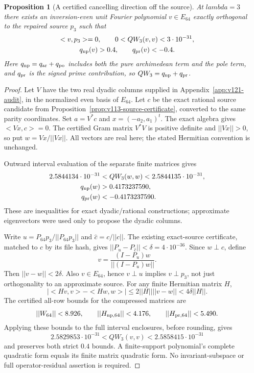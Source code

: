 \documentclass[11pt]{article}
\def\lambda{lambda}%
\def\norm#1{||#1||}%
\def\ip#1#2{<#1,#2>}%
\newtheorem{proposition}[theorem]{Proposition}
\theoremstyle{remark}
\newcommand{\norm}[1]{\left\lVert #1\right\rVert}
\newcommand{\ip}[2]{\left\langle #1,#2\right\rangle}
\begin{document}
\begin{proposition}[A certified cancelling direction off the source]
\label{prop:v121-complement-cancellation}
At $\lambda=3$ there exists an inversion-even unit Fourier polynomial
$v\in E_{64}$ exactly orthogonal to the repaired source $p_3$ such that
\begin{equation}\label{eq:v121-complement-cancellation}
 \begin{gathered}
 \ip{v}{p_3}=0,\qquad
 0<QW_3(v,v)<3\cdot10^{-31},\\
 q_{\rm np}(v)>0.4,\qquad q_{\rm pr}(v)<-0.4.
 \end{gathered}
\end{equation}
Here $q_{\rm np}=q_{\rm ar}+q_{\rm po}$ includes both the pure
archimedean term and the pole term, and $q_{\rm pr}$ is the signed
prime contribution, so $QW_3=q_{\rm np}+q_{\rm pr}$.
\end{proposition}
\begin{proof}
Let $V$ have the two real dyadic columns supplied in
Appendix~\ref{app:v121-audit}, in the normalized even basis of $E_{64}$.
Let $c$ be the exact rational source candidate from
Proposition~\ref{prop:v113-source-certificate}, converted to the same
parity coordinates. Set $a=V^*c$ and $x=(-a_2,a_1)^t$. The exact
algebra gives $\ip{Vx}{c}=0$. The certified Gram matrix $V^*V$ is
positive definite and $\norm{Vx}>0$, so put $w=Vx/\norm{Vx}$.
All vectors are real here; the stated Hermitian convention is unchanged.

Outward interval evaluation of the separate finite matrices gives
\[
 \begin{aligned}
 2.5844134\cdot10^{-31}&<QW_3(w,w)<2.5844135\cdot10^{-31},\\
 q_{\rm np}(w)&>0.4173237590,\\
 q_{\rm pr}(w)&<-0.4173237590.
 \end{aligned}
\]
These are inequalities for exact dyadic/rational constructions;
approximate eigenvectors were used only to propose the dyadic columns.

Write $u=P_{64}p_3/\norm{P_{64}p_3}$ and $\widehat c=c/\norm c$.
The existing exact-source certificate, matched to $c$ by its file hash,
gives $\norm{P_u-P_{\widehat c}}<\delta=4\cdot10^{-36}$.
Since $w\perp c$, define
\[
 v=\frac{(I-P_u)w}{\norm{(I-P_u)w}}.
\]
Then $\norm{v-w}<2\delta$. Also $v\in E_{64}$, hence $v\perp u$
implies $v\perp p_3$, not just orthogonality to an approximate source.
For any finite Hermitian matrix $H$,
\[
 |\ip{Hv}{v}-\ip{Hw}{w}|
 \le2\norm H\norm{v-w}<4\delta\norm H.
\]
The certified all-row bounds for the compressed matrices are
\[
 \norm{W_{64}}<8.926,\qquad
 \norm{H_{\rm np,64}}<4.176,\qquad
 \norm{H_{\rm pr,64}}<5.490.
\]
Applying these bounds to the full interval enclosures, before rounding,
gives
\[
 2.5829853\cdot10^{-31}<QW_3(v,v)<2.5858415\cdot10^{-31}
\]
and preserves both strict $0.4$ bounds. A finite-support polynomial's
complete quadratic form equals its finite matrix quadratic form.
No invariant-subspace or full operator-residual assertion is required.
\end{proof}
\end{document}
